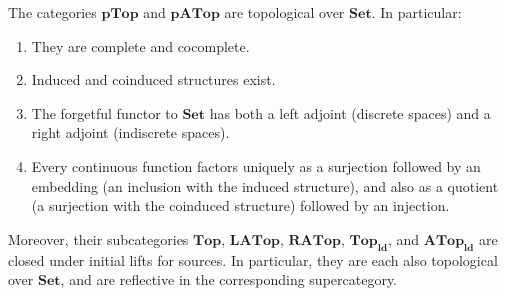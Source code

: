 \documentclass{article}
\def\nn{\ensuremath{\neg\neg}}
\def\Set{\mathbf{Set}}
\def\PTop{\mathbf{pTop}}
\def\Top{\mathbf{Top}}
\def\PTopnn{\mathbf{pTop}_{\nn}}
\def\ldTop{\mathbf{Top}_{\mathbf{ld}}}
\def\PATop{\mathbf{pATop}}
\def\LATop{\mathbf{LATop}}
\def\RATop{\mathbf{RATop}}
\def\PATopnn{\mathbf{pATop}_{\nn}}
\def\ldATop{\mathbf{ATop}_{\mathbf{ld}}}
\begin{document}
\begin{thm}\label{thm:top-topconcrete}
  The categories $\PTop$ and $\PATop$ are topological over $\Set$.
  In particular:
  \begin{enumerate}
  \item They are complete and cocomplete.
  \item Induced and coinduced structures exist.
  \item The forgetful functor to $\Set$ has both a left adjoint (discrete spaces) and a right adjoint (indiscrete spaces).
  \item Every continuous function factors uniquely as a surjection followed by an embedding (an inclusion with the induced structure), and also as a quotient (a surjection with the coinduced structure) followed by an injection.
  \end{enumerate}
  Moreover, their subcategories $\Top$, $\LATop$, $\RATop$, %
  $\ldTop$, and $\ldATop$ %
  are closed under initial lifts for sources.
  In particular, they are each also topological over $\Set$, and are reflective in the corresponding supercategory.
\end{thm}
\end{document}
